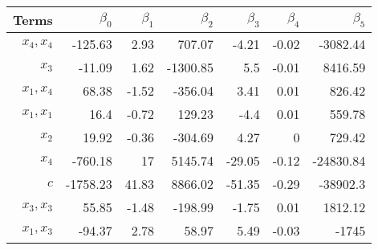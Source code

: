\begin{tabular}{rrrrrrr}
Terms & $\beta_0$ & $\beta_1$ & $\beta_2$ & $\beta_3$ & $\beta_4$ & $\beta_5$ \\ 
\hline 
$x_4,x_4$ & -125.63 & 2.93 & 707.07 & -4.21 & -0.02 & -3082.44 \\ 
$x_3$ & -11.09 & 1.62 & -1300.85 & 5.5 & -0.01 & 8416.59 \\ 
$x_1,x_4$ & 68.38 & -1.52 & -356.04 & 3.41 & 0.01 & 826.42 \\ 
$x_1,x_1$ & 16.4 & -0.72 & 129.23 & -4.4 & 0.01 & 559.78 \\ 
$x_2$ & 19.92 & -0.36 & -304.69 & 4.27 & 0 & 729.42 \\ 
$x_4$ & -760.18 & 17 & 5145.74 & -29.05 & -0.12 & -24830.84 \\ 
$c$ & -1758.23 & 41.83 & 8866.02 & -51.35 & -0.29 & -38902.3 \\ 
$x_3,x_3$ & 55.85 & -1.48 & -198.99 & -1.75 & 0.01 & 1812.12 \\ 
$x_1,x_3$ & -94.37 & 2.78 & 58.97 & 5.49 & -0.03 & -1745 \\ 
\hline 
\end{tabular}